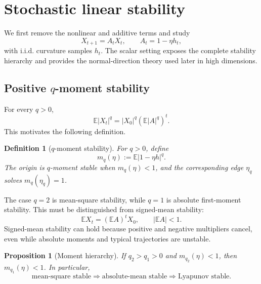 \documentclass[11pt]{article}
\newcommand{\E}{\mathbb{E}}
\newtheorem{proposition}{Proposition}
\newtheorem{definition}{Definition}
\begin{document}
\section{Stochastic linear stability}

We first remove the nonlinear and additive terms and study
\begin{equation}
    X_{t+1}=A_tX_t,
    \qquad A_t=1-\eta h_t,
    \label{eq:scalarlinear}
\end{equation}
with i.i.d. curvature samples $h_t$.  The scalar setting exposes the complete stability hierarchy and provides the normal-direction theory used later in high dimensions.

\subsection{Positive $q$-moment stability}

For every $q>0$,
\begin{equation}
    \E|X_t|^q=|X_0|^q\left(\E|A|^q\right)^t.
\end{equation}
This motivates the following definition.

\begin{definition}[$q$-moment stability]
For $q>0$, define
\begin{equation}
    m_q(\eta):=\E|1-\eta h|^q.
\end{equation}
The origin is $q$-moment stable when $m_q(\eta)<1$, and the corresponding edge $\eta_q$ solves $m_q(\eta_q)=1$.
\end{definition}

The case $q=2$ is mean-square stability, while $q=1$ is absolute first-moment stability.  This must be distinguished from signed-mean stability:
\begin{equation}
    \E X_t=\left(\E A\right)^tX_0,
    \qquad |\E A|<1.
    \label{eq:signedmean}
\end{equation}
Signed-mean stability can hold because positive and negative multipliers cancel, even while absolute moments and typical trajectories are unstable.

\begin{proposition}[Moment hierarchy]
If $q_2>q_1>0$ and $m_{q_2}(\eta)<1$, then $m_{q_1}(\eta)<1$.  In particular,
\begin{equation}
    \text{mean-square stable}
    \Longrightarrow
    \text{absolute-mean stable}
    \Longrightarrow
    \text{Lyapunov stable}.
    \label{eq:hierarchy}
\end{equation}
\end{proposition}
\end{document}
